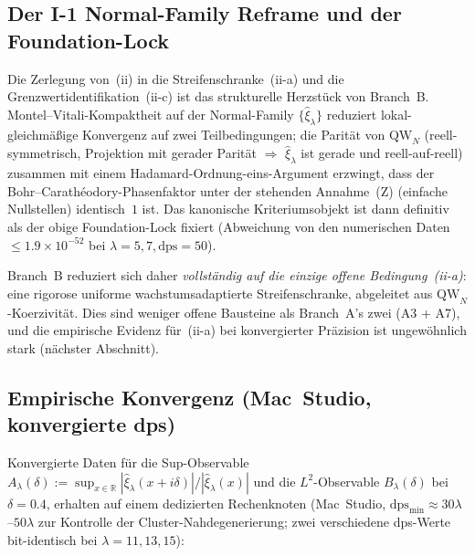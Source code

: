 \documentclass[12pt,a4paper]{article}
\theoremstyle{definition}
\theoremstyle{remark}
\begin{document}
\subsection{Der I-1 Normal-Family Reframe und der Foundation-Lock}
\label{sec:i1-reframe}

Die Zerlegung von~(ii) in die Streifenschranke~(ii-a) und die
Grenzwertidentifikation~(ii-c) ist das strukturelle Herzstück von
Branch~B. Montel--Vitali-Kompaktheit auf der Normal-Family
$\{\hat\xi_\lambda\}$ reduziert lokal-gleichmäßige Konvergenz auf zwei
Teilbedingungen; die Parität von $\mathrm{QW}_N$ (reell-symmetrisch,
Projektion mit gerader Parität $\Rightarrow$ $\hat\xi_\lambda$ ist
gerade und reell-auf-reell) zusammen mit einem
Hadamard-Ordnung-eins-Argument erzwingt, dass der
Bohr--Carath\'eodory-Phasenfaktor unter der stehenden Annahme~(Z)
(einfache Nullstellen) identisch~$1$ ist. Das kanonische
Kriteriumsobjekt ist dann definitiv als der obige Foundation-Lock
fixiert (Abweichung von den numerischen Daten
$\leq 1.9\times 10^{-52}$ bei $\lambda=5,7,\mathrm{dps}=50$).

Branch~B reduziert sich daher \emph{vollständig auf die einzige offene
Bedingung~(ii-a)}: eine rigorose uniforme wachstumsadaptierte
Streifenschranke, abgeleitet aus $\mathrm{QW}_N$-Koerzivität. Dies
sind weniger offene Bausteine als Branch~A's zwei (A3 + A7), und die
empirische Evidenz für~(ii-a) bei konvergierter Präzision ist
ungewöhnlich stark (nächster Abschnitt).


\subsection{Empirische Konvergenz (Mac~Studio, konvergierte dps)}
\label{sec:branch-b-empirics}

Konvergierte Daten für die Sup-Observable
$A_\lambda(\delta):=\sup_{x\in\mathbb R}|\hat\xi_\lambda(x+i\delta)|
/|\hat\xi_\lambda(x)|$ und die $L^2$-Observable $B_\lambda(\delta)$ bei
$\delta = 0.4$, erhalten auf einem dedizierten Rechenknoten (Mac~Studio,
$\mathrm{dps}_{\min}\approx 30\lambda$--$50\lambda$ zur Kontrolle der
Cluster-Nahdegenerierung; zwei verschiedene dps-Werte bit-identisch bei
$\lambda=11,13,15$):
\end{document}
